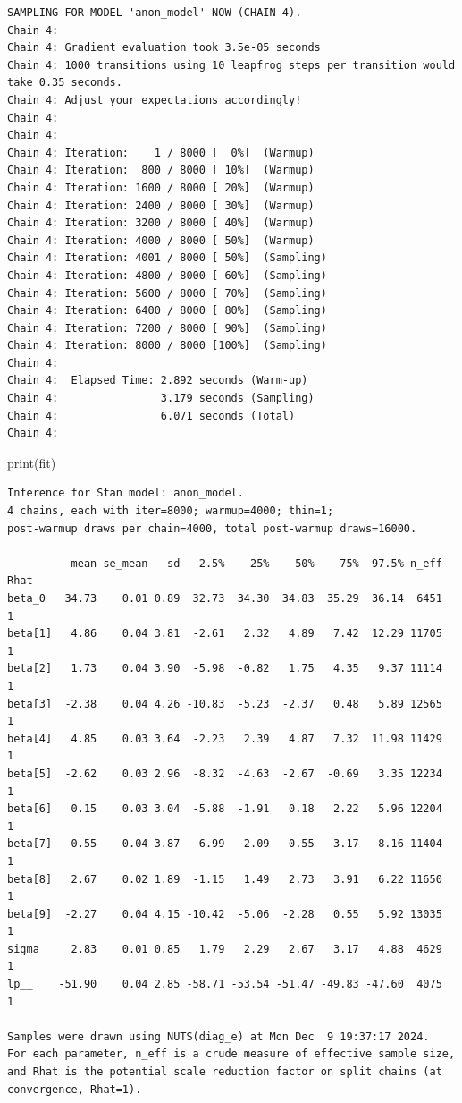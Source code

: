 \documentclass[
  10pt,
]{article}
\newenvironment{Shaded}{\begin{snugshade}}{\end{snugshade}}
\newcommand{\FunctionTok}[1]{\textcolor[rgb]{0.28,0.35,0.67}{#1}}
\newcommand{\NormalTok}[1]{\textcolor[rgb]{0.00,0.23,0.31}{#1}}
\begin{document}
\begin{verbatim}
SAMPLING FOR MODEL 'anon_model' NOW (CHAIN 4).
Chain 4: 
Chain 4: Gradient evaluation took 3.5e-05 seconds
Chain 4: 1000 transitions using 10 leapfrog steps per transition would take 0.35 seconds.
Chain 4: Adjust your expectations accordingly!
Chain 4: 
Chain 4: 
Chain 4: Iteration:    1 / 8000 [  0%]  (Warmup)
Chain 4: Iteration:  800 / 8000 [ 10%]  (Warmup)
Chain 4: Iteration: 1600 / 8000 [ 20%]  (Warmup)
Chain 4: Iteration: 2400 / 8000 [ 30%]  (Warmup)
Chain 4: Iteration: 3200 / 8000 [ 40%]  (Warmup)
Chain 4: Iteration: 4000 / 8000 [ 50%]  (Warmup)
Chain 4: Iteration: 4001 / 8000 [ 50%]  (Sampling)
Chain 4: Iteration: 4800 / 8000 [ 60%]  (Sampling)
Chain 4: Iteration: 5600 / 8000 [ 70%]  (Sampling)
Chain 4: Iteration: 6400 / 8000 [ 80%]  (Sampling)
Chain 4: Iteration: 7200 / 8000 [ 90%]  (Sampling)
Chain 4: Iteration: 8000 / 8000 [100%]  (Sampling)
Chain 4: 
Chain 4:  Elapsed Time: 2.892 seconds (Warm-up)
Chain 4:                3.179 seconds (Sampling)
Chain 4:                6.071 seconds (Total)
Chain 4: 
\end{verbatim}

\begin{Shaded}
\begin{Highlighting}[]
\FunctionTok{print}\NormalTok{(fit)}
\end{Highlighting}
\end{Shaded}

\begin{verbatim}
Inference for Stan model: anon_model.
4 chains, each with iter=8000; warmup=4000; thin=1; 
post-warmup draws per chain=4000, total post-warmup draws=16000.

          mean se_mean   sd   2.5%    25%    50%    75%  97.5% n_eff Rhat
beta_0   34.73    0.01 0.89  32.73  34.30  34.83  35.29  36.14  6451    1
beta[1]   4.86    0.04 3.81  -2.61   2.32   4.89   7.42  12.29 11705    1
beta[2]   1.73    0.04 3.90  -5.98  -0.82   1.75   4.35   9.37 11114    1
beta[3]  -2.38    0.04 4.26 -10.83  -5.23  -2.37   0.48   5.89 12565    1
beta[4]   4.85    0.03 3.64  -2.23   2.39   4.87   7.32  11.98 11429    1
beta[5]  -2.62    0.03 2.96  -8.32  -4.63  -2.67  -0.69   3.35 12234    1
beta[6]   0.15    0.03 3.04  -5.88  -1.91   0.18   2.22   5.96 12204    1
beta[7]   0.55    0.04 3.87  -6.99  -2.09   0.55   3.17   8.16 11404    1
beta[8]   2.67    0.02 1.89  -1.15   1.49   2.73   3.91   6.22 11650    1
beta[9]  -2.27    0.04 4.15 -10.42  -5.06  -2.28   0.55   5.92 13035    1
sigma     2.83    0.01 0.85   1.79   2.29   2.67   3.17   4.88  4629    1
lp__    -51.90    0.04 2.85 -58.71 -53.54 -51.47 -49.83 -47.60  4075    1

Samples were drawn using NUTS(diag_e) at Mon Dec  9 19:37:17 2024.
For each parameter, n_eff is a crude measure of effective sample size,
and Rhat is the potential scale reduction factor on split chains (at 
convergence, Rhat=1).
\end{verbatim}
\end{document}
